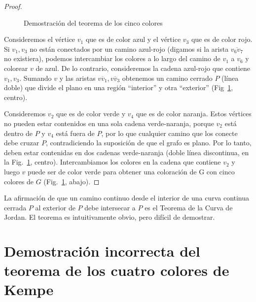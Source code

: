 \begin{proof}
\begin{figure}
\begin{center}
\end{center}
\caption{Demostración del teorema de los cinco colores}\label{f.five-color-proof}
\end{figure}

Consideremos el vértice $v_1$ que es de color azul y el vértice $v_3$ que es de color rojo. Si $v_1,v_3$ no están conectados por un camino azul-rojo (digamos si la arista $\overline{v_6v_7}$ no existiera), podemos intercambiar los colores a lo largo del camino de $v_1$ a $v_6$ y colorear $v$ de azul. De lo contrario, consideremos la cadena azul-rojo que contiene $v_1,v_3$. Sumando $v$ y las aristas $\overline{vv_1},\overline{vv_3}$ obtenemos un camino cerrado $P$ (línea doble) que divide el plano en una región ``interior'' y otra ``exterior'' (Fig~\ref{f.five-color-proof}, centro).

Consideremos $v_2$ que es de color verde y $v_4$ que es de color naranja. Estos vértices no pueden estar contenidos en una sola cadena verde-naranja, porque $v_2$ está dentro de $P$ y $v_4$ está fuera de $P$, por lo que cualquier camino que los conecte debe cruzar $P$, contradiciendo la suposición de que el grafo es plano. Por lo tanto, deben estar contenidas en dos cadenas verde-naranja (doble línea discontinua, en la Fig.~\ref{f.five-color-proof}, centro).
Intercambiamos los colores en la cadena que contiene $v_2$ y luego $v$ puede ser de color verde para obtener una coloración de G con cinco colores de $G$ (Fig.~\ref{f.five-color-proof}, abajo).
\end{proof}

\begin{advanced}
La afirmación de que un camino continuo desde el interior de una curva continua cerrada $P$ al exterior de $P$ debe intersecar a $P$ es el Teorema de la Curva de Jordan. El teorema es intuitivamente obvio, pero difícil de demostrar.
\end{advanced}


\section{Demostración incorrecta del teorema de los cuatro colores de Kempe}\label{s.kempe}


